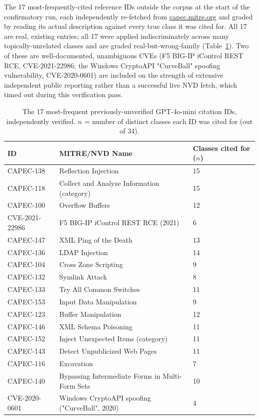 \documentclass[10pt,twocolumn]{article}
\begin{document}
The 17 most-frequently-cited reference IDs outside the corpus at the start of the confirmatory
run, each independently re-fetched from \url{capec.mitre.org} and graded by reading its actual
description against every true class it was cited for. All 17 are real, existing entries; all 17
were applied indiscriminately across many topically-unrelated classes and are graded
real-but-wrong-family (Table~\ref{tab:newids}). Two of these are well-documented, unambiguous CVEs
(F5 BIG-IP iControl REST RCE, CVE-2021-22986; the Windows CryptoAPI "CurveBall" spoofing
vulnerability, CVE-2020-0601) are included on the strength of extensive independent public
reporting rather than a successful live NVD fetch, which timed out during this verification pass.

\begin{table}[t]
\centering
\caption{The 17 most-frequent previously-unverified GPT-4o-mini citation IDs, independently
verified. $n$ = number of distinct classes each ID was cited for (out of 34).}
\label{tab:newids}
\begin{tabular}{lll}
\toprule
ID & MITRE/NVD Name & Classes cited for ($n$) \\
\midrule
CAPEC-138 & Reflection Injection & 15 \\
CAPEC-118 & Collect and Analyze Information (category) & 15 \\
CAPEC-100 & Overflow Buffers & 12 \\
CVE-2021-22986 & F5 BIG-IP iControl REST RCE (2021) & 6 \\
CAPEC-147 & XML Ping of the Death & 13 \\
CAPEC-136 & LDAP Injection & 14 \\
CAPEC-104 & Cross Zone Scripting & 9 \\
CAPEC-132 & Symlink Attack & 8 \\
CAPEC-133 & Try All Common Switches & 11 \\
CAPEC-153 & Input Data Manipulation & 9 \\
CAPEC-123 & Buffer Manipulation & 12 \\
CAPEC-146 & XML Schema Poisoning & 11 \\
CAPEC-152 & Inject Unexpected Items (category) & 11 \\
CAPEC-143 & Detect Unpublicized Web Pages & 11 \\
CAPEC-116 & Excavation & 7 \\
CAPEC-140 & Bypassing Intermediate Forms in Multi-Form Sets & 10 \\
CVE-2020-0601 & Windows CryptoAPI spoofing ("CurveBall", 2020) & 4 \\
\bottomrule
\end{tabular}
\end{table}
\end{document}
